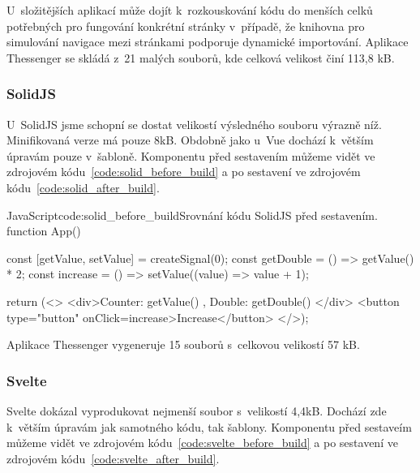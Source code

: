 \documentclass[
  master,
  program=ainf,
  tables=false,
  sourcecodes,
  glossaries,
  index
]{kidiplom}
\begin{document}
U~složitějších aplikací může dojít k~rozkouskování kódu do menších celků potřebných pro fungování
konkrétní stránky v~případě, že knihovna pro simulování navigace mezi stránkami podporuje dynamické importování.
Aplikace Thessenger se skládá z~21 malých souborů, kde celková velikost činí 113,8 kB.

\subsubsection{SolidJS}
U~SolidJS \cite{solidjs} jsme schopní se dostat velikostí výsledného souboru výrazně níž. Minifikovaná verze má pouze
8kB. Obdobně jako u~Vue \cite{vue} dochází k~větším úpravám pouze v~šabloně. Komponentu před sestavením můžeme vidět
ve zdrojovém kódu~\ref{code:solid_before_build} a po sestavení ve zdrojovém kódu~\ref{code:solid_after_build}.

  \begin{kicode}{JavaScript}{code:solid_before_build}{Srovnání kódu SolidJS před sestavením.}
    function App() {
      const [getValue, setValue] = createSignal(0);
      const getDouble = () => getValue() * 2;
      const increase = () => setValue((value) => value + 1);
    
      return (<>
        <div>Counter: { getValue() }, Double: { getDouble() }</div>
        <button type="button" onClick={increase}>Increase</button>
      </>);
    }
\end{kicode}


Aplikace Thessenger vygeneruje 15 souborů s~celkovou velikostí 57 kB.

\subsubsection{Svelte}
Svelte \cite{svelte} dokázal vyprodukovat nejmenší soubor s~velikostí 4,4kB. Dochází zde k~větším úpravám
jak samotného kódu, tak šablony. Komponentu před sestaveím můžeme vidět ve zdrojovém kódu~\ref{code:svelte_before_build} a po
sestavení ve zdrojovém kódu~\ref{code:svelte_after_build}. 
\end{document}
